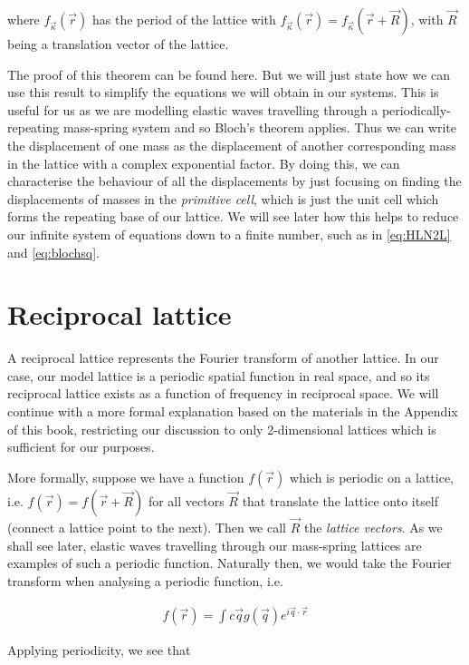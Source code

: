 where $f_{\vec{\kappa}}(\vec{r})$ has the period of the lattice with
$f_{\vec{\kappa}}(\vec{r})=f_{\vec{\kappa}}(\vec{r}+\vec{R})$, with $\vec{R}$ being a
translation vector of the lattice.

The proof of this theorem can be found here.\cite{kittel} But we will just
state how we can use this result to simplify the equations we will obtain in
our systems. This is useful for us as we are modelling elastic waves travelling
through a periodically-repeating mass-spring system and so Bloch's theorem
applies. Thus we can write the displacement of one mass as the displacement of
another corresponding mass in the lattice with a complex exponential factor. By
doing this, we can characterise the behaviour of all the displacements by just
focusing on finding the displacements of masses in the \textit{primitive cell},
which is just the unit cell which forms the repeating base of our lattice. We
will see later how this helps to reduce our infinite system of equations down
to a finite number, such as in \eqref{eq:HLN2L} and \eqref{eq:blochsq}.

\section{Reciprocal lattice}
\label{reclatbg}
A reciprocal lattice represents the Fourier transform of another lattice. In
our case, our model lattice is a periodic spatial function in real space, and
so its reciprocal lattice exists as a function of frequency in reciprocal
space.  We will continue with a more formal explanation based on the materials
in the Appendix of this book,\cite{moldinglight} restricting our discussion to
only 2-dimensional lattices which is sufficient for our purposes.

More formally, suppose we have a function $f(\vec{r})$ which is periodic on a
lattice, i.e. $f(\vec{r})=f(\vec{r}+\vec{R})$ for all vectors $\vec{R}$
that translate the lattice onto itself (connect a lattice point to the next).
Then we call $\vec{R}$ the \textit{lattice vectors}. As we shall see later,
elastic waves travelling through our mass-spring lattices are examples of such
a periodic function. Naturally then, we would take the Fourier transform when analysing a periodic function, i.e.

\begin{align}
  f(\vec{r})=\int c\vec{q}g(\vec{q})e^{i\vec{q}\cdot\vec{r}}
\end{align}

Applying periodicity, we see that

